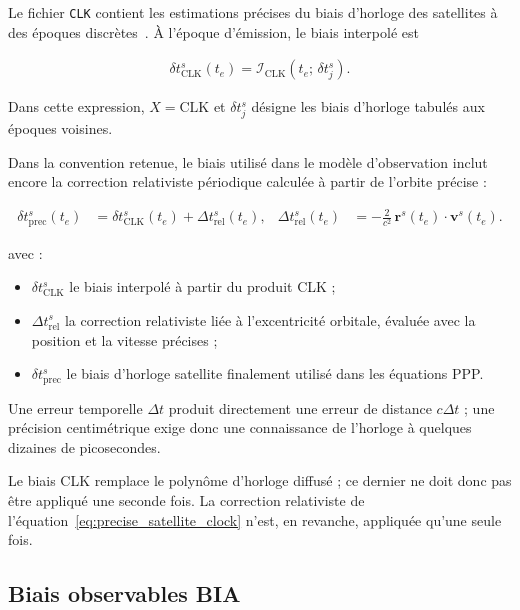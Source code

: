 Le fichier \texttt{CLK} contient les estimations précises du biais d'horloge
des satellites à des époques discrètes~\cite{rinexClock304}. À l'époque d'émission, le biais
interpolé est

\begin{align}
\delta t_{\mathrm{CLK}}^s(t_e)
=
\mathcal{I}_{\mathrm{CLK}}
\!\left(t_e;\,\delta t_j^s\right).
\label{eq:clk_interpolation}
\end{align}

Dans cette expression, $X=\mathrm{CLK}$ et $\delta t_j^s$ désigne les biais
d'horloge tabulés aux époques voisines.

Dans la convention retenue, le biais utilisé dans le modèle d'observation
inclut encore la correction relativiste périodique calculée à partir de
l'orbite précise :

\begin{align}
\delta t_{\mathrm{prec}}^s(t_e)
&=
\delta t_{\mathrm{CLK}}^s(t_e)+\Delta t_{\mathrm{rel}}^s(t_e),
&
\Delta t_{\mathrm{rel}}^s(t_e)
&=-\frac{2}{c^2}\,\mathbf r^s(t_e)\cdot\mathbf v^s(t_e).
\label{eq:precise_satellite_clock}
\end{align}

avec :

\begin{itemize}
    \item $\delta t_{\mathrm{CLK}}^s$ le biais interpolé à partir du produit
    CLK ;
    \item $\Delta t_{\mathrm{rel}}^s$ la correction relativiste liée à
    l'excentricité orbitale, évaluée avec la position et la vitesse précises ;
    \item $\delta t_{\mathrm{prec}}^s$ le biais d'horloge satellite finalement
    utilisé dans les équations PPP.
\end{itemize}

Une erreur temporelle $\Delta t$ produit directement une erreur de distance
$c\Delta t$ ; une précision centimétrique exige donc une connaissance de
l'horloge à quelques dizaines de picosecondes. 

Le biais CLK remplace le polynôme d'horloge diffusé ; ce dernier ne doit donc
pas être appliqué une seconde fois. La correction relativiste de
l'équation~\eqref{eq:precise_satellite_clock} n'est, en revanche, appliquée
qu'une seule fois. 

\subsection{Biais observables BIA}\label{biais_obs}

